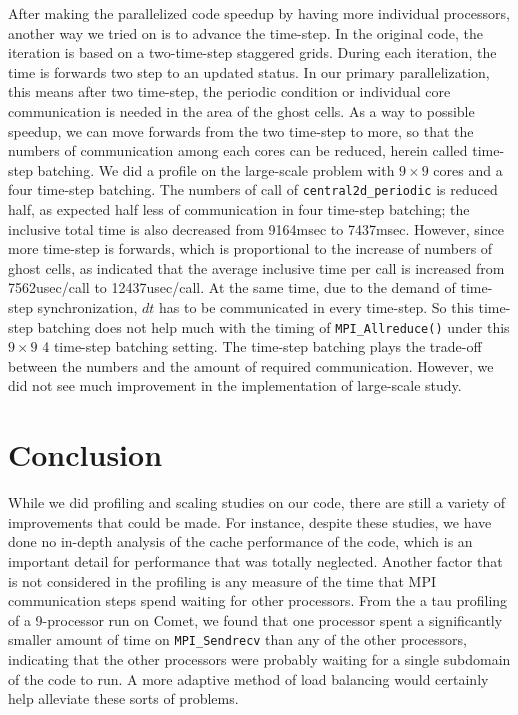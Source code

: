 \documentclass{article}
\begin{document}
After making the parallelized code speedup by having more individual processors, another way we tried on is to advance the time-step. In the original code, the iteration is based on a two-time-step staggered grids. During each iteration, the time is forwards two step to an updated status. In our primary parallelization, this means after two time-step, the periodic condition or individual core communication is needed in the area of the ghost cells. As a way to possible speedup, we can move forwards from the two time-step to more, so that the numbers of communication among each cores can be reduced, herein called time-step batching. We did a profile on the large-scale problem with $9\times9$ cores and a four time-step batching. The numbers of call of \texttt{central2d\_periodic} is reduced half, as expected half less of communication in four time-step batching; the inclusive total time is also decreased from 9164msec to 7437msec. However, since more time-step is forwards, which is proportional to the increase of numbers of ghost cells, as indicated that the average inclusive time per call is increased from 7562usec/call to 12437usec/call. At the same time, due to the demand of time-step synchronization, $dt$ has to be communicated in every time-step. So this time-step batching does not help much with the timing of \texttt{MPI\_Allreduce()} under this $9\times9$ 4 time-step batching setting. The time-step batching plays the trade-off between the numbers and the amount of required communication. However, we did not see much improvement in the implementation of large-scale study.



\section{Conclusion}
While we did profiling and scaling studies on our code, there are still a variety of improvements that could be made. For instance, despite these studies, we have done no in-depth analysis of the cache performance of the code, which is an important detail for performance that was totally neglected. Another factor that is not considered in the profiling is any measure of the time that MPI communication steps spend waiting for other processors. From the a tau profiling of a 9-processor run on Comet, we found that one processor spent a significantly smaller amount of time on \texttt{MPI\_Sendrecv} than any of the other processors, indicating that the other processors were probably waiting for a single subdomain of the code to run. A more adaptive method of load balancing would certainly help alleviate these sorts of problems. 
\end{document}
